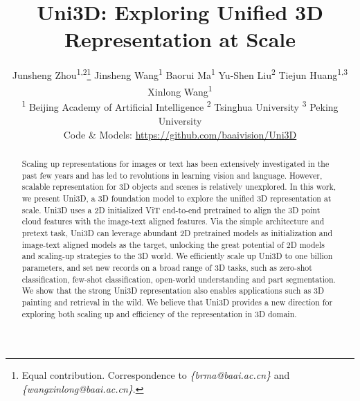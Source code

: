 \documentclass{article} \usepackage{iclr2024_conference,times}
\def\Ours{Uni3D\xspace}
\newcommand{\authorskip}{\hspace{12mm}}
\begin{document}
\title{\Ours: Exploring Unified 3D Representation at Scale}




\author{Junsheng Zhou\textsuperscript{1,2}\thanks{Equal contribution. Correspondence to \textit{\{brma@baai.ac.cn\}} and \textit{\{wangxinlong@baai.ac.cn\}}. 
} 
\authorskip Jinsheng Wang\textsuperscript{1} \authorskip Baorui Ma\textsuperscript{1} \authorskip Yu-Shen Liu\textsuperscript{2} \authorskip  
Tiejun Huang\textsuperscript{1,3} \authorskip Xinlong Wang\textsuperscript{1}  \\
{
\fontsize{10.4pt}{9.84pt}\selectfont
\textsuperscript{1} Beijing Academy of Artificial Intelligence \hspace{5mm} 
\textsuperscript{2} Tsinghua University \hspace{5mm} \textsuperscript{3} Peking University}\\

{
\fontsize{9.4pt}{9.84pt}\selectfont 
\vspace{0.2cm}
Code \& Models: {\url{https://github.com/baaivision/Uni3D}}
}
}



\newcommand{\fix}{\marginpar{FIX}}
\newcommand{\new}{\marginpar{NEW}}

\iclrfinalcopy 


\maketitle

\begin{abstract}





Scaling up representations for images or text has been extensively investigated in the past few years and has led to revolutions in learning vision and language.
However, scalable representation for 3D objects and scenes is relatively unexplored.
In this work, we present \Ours, a 3D foundation model to explore the unified 3D representation at scale.
\Ours uses a 2D initialized ViT end-to-end pretrained to align the 3D point cloud features with the image-text aligned features.
Via the simple architecture and pretext task, \Ours can leverage abundant 2D pretrained models as initialization and image-text aligned models as the target, unlocking the great potential of 2D models and scaling-up strategies to the 3D world.
We efficiently scale up \Ours to one billion parameters, and set new records on a broad range of 3D tasks, such as zero-shot classification, few-shot classification, open-world understanding and part segmentation. 
We show that the strong \Ours representation also enables applications such as 3D painting and retrieval in the wild.
We believe that \Ours provides a new direction for exploring both scaling up and efficiency of the representation in 3D domain.


\end{abstract}
\end{document}
